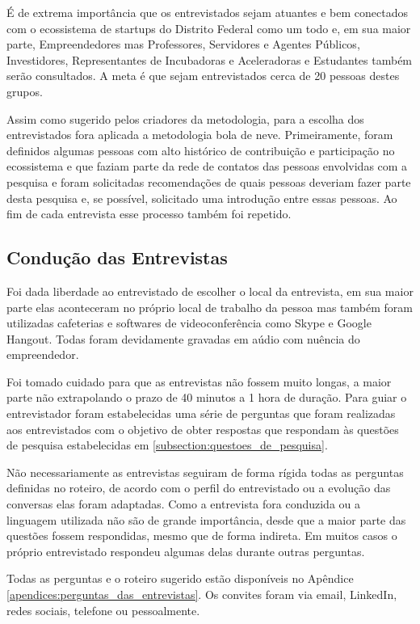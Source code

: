 É de extrema importância que os entrevistados sejam atuantes e bem conectados com o ecossistema de startups do Distrito Federal como um todo e, em sua maior parte, Empreendedores mas Professores, Servidores e Agentes Públicos, Investidores, Representantes de Incubadoras e Aceleradoras e Estudantes também serão consultados. A meta é que sejam entrevistados cerca de 20 pessoas destes grupos.

Assim como sugerido pelos criadores da metodologia, para a escolha dos entrevistados fora aplicada a metodologia bola de neve. Primeiramente, foram definidos algumas pessoas com alto histórico de contribuição e participação no ecossistema e que faziam parte da rede de contatos das pessoas envolvidas com a pesquisa e foram solicitadas recomendações de quais pessoas deveriam fazer parte desta pesquisa e, se possível, solicitado uma introdução entre essas pessoas. Ao fim de cada entrevista esse processo também foi repetido.

\subsection{Condução das Entrevistas}
\label{subsection:conducao_das_entrevistas}

Foi dada liberdade ao entrevistado de escolher o local da entrevista, em sua maior parte elas aconteceram no próprio local de trabalho da pessoa mas também foram utilizadas cafeterias e softwares de videoconferência como Skype e Google Hangout. Todas foram devidamente gravadas em aúdio com nuência do empreendedor.

Foi tomado cuidado para que as entrevistas não fossem muito longas, a maior parte não extrapolando o prazo de 40 minutos a 1 hora de duração. Para guiar o entrevistador foram estabelecidas uma série de perguntas que foram realizadas aos entrevistados com o objetivo de obter respostas que respondam às questões de pesquisa estabelecidas em \ref{subsection:questoes_de_pesquisa}.

Não necessariamente as entrevistas seguiram de forma rígida todas as perguntas definidas no roteiro, de acordo com o perfil do entrevistado ou a evolução das conversas elas foram adaptadas. Como a entrevista fora conduzida ou a linguagem utilizada não são de grande importância, desde que a maior parte das questões fossem respondidas, mesmo que de forma indireta. Em muitos casos o próprio entrevistado respondeu algumas delas durante outras perguntas. 

Todas as perguntas e o roteiro sugerido estão disponíveis no Apêndice \ref{apendices:perguntas_das_entrevistas}. Os convites foram via email, LinkedIn, redes sociais, telefone ou pessoalmente.

